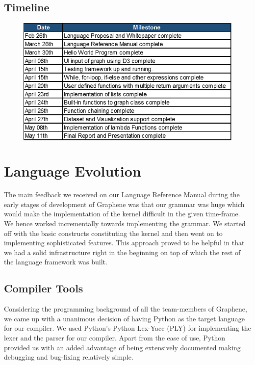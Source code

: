 \documentclass[a4paper]{article}
\begin{document}
\subsection{Timeline}

\begin{figure}[h]
\centering
\includegraphics[width=1.0\textwidth]{timeline-1.png}
\end{figure}

\newpage
\section{Language Evolution}
The main feedback we received on our Language Reference Manual during the early stages of development of Graphene was that our grammar was huge which would make the implementation of the kernel difficult in the given time-frame. We hence worked incrementally towards implementing the grammar. We started off with the basic constructs constituting the kernel and then went on to implementing sophisticated features. This approach proved to be helpful in that we had a solid infrastructure right in the beginning on top of which the rest of the language framework was built.


\subsection{Compiler Tools}

Considering the programming background of all the team-members of Graphene, we came up with a unanimous decision of having Python as the target language for our compiler. We used Python’s Python Lex-Yacc (PLY) for implementing the lexer and the parser for our compiler. Apart from the ease of use, Python provided us with an added advantage of being extensively documented making debugging and bug-fixing relatively simple.\\
\end{document}

